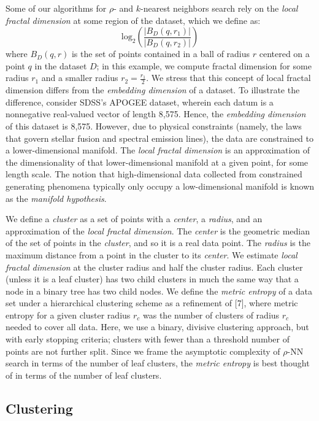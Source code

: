 Some of our algorithms for $\rho$- and $k$-nearest neighbors search rely on the \emph{local fractal dimension} at some region of the dataset, 
which we define as: 
$$\text{log}_2 (\frac{|B_D(q, r_1)|}{|B_D(q, r_2)|})$$
where $B_D(q, r)$ is the set of points contained in a ball of radius $r$ 
centered on a point $q$ in the dataset $D$; in this example, we compute fractal dimension for some radius $r_1$ and a smaller radius $r_2 = \frac{r_1}{2}$.
We stress that this concept of local fractal dimension differs from the \emph{embedding dimension} of a dataset. To illustrate the difference,
consider SDSS's APOGEE dataset, wherein each datum is a nonnegative real-valued vector of length 8,575. Hence, the \emph{embedding dimension} of this dataset is 8,575. 
However, due to physical constraints (namely, the laws that govern stellar fusion and spectral emission lines), the data are constrained to a lower-dimensional 
manifold. The \emph{local fractal dimension} is an approximation of the dimensionality of that lower-dimensional manifold at a given point, for some length scale.
The notion that high-dimensional data collected from constrained generating phenomena typically only occupy a low-dimensional manifold is known as the \emph{manifold hypothesis}.


We define a \emph{cluster} as a set of points with a \emph{center}, a \emph{radius}, and an approximation of the \emph{local fractal dimension}.
The \emph{center} is the geometric median of the set of points in the \emph{cluster}, and so it is a real data point. The \emph{radius} is the
maximum distance from a point in the cluster to its \emph{center}. We estimate \emph{local fractal dimension} at the cluster radius and half
the cluster radius. Each cluster (unless it is a leaf cluster) has two child clusters in much the same way that a node in
a binary tree has two child nodes. We define the \emph{metric entropy} of a data set under a hierarchical clustering scheme as a refinement of [7], where
metric entropy for a given cluster radius $r_c$ was the number of clusters of radius $r_c$ needed to cover all data. Here, we use a binary, divisive clustering 
approach, but with early stopping criteria; clusters with fewer than a threshold number of points are not further split. 
Since we frame the asymptotic complexity of $\rho$-NN search in terms of the number of leaf clusters, the \emph{metric entropy} is best thought of in terms of the number of
leaf clusters. 


\subsection{Clustering}
\label{subsec:methods:clustering}

